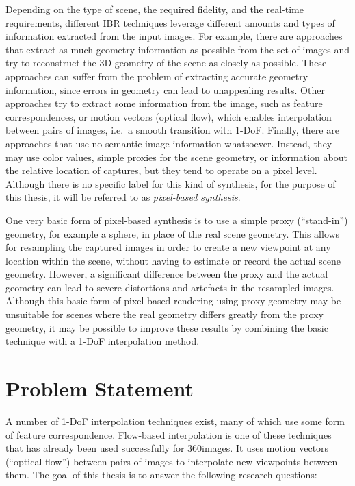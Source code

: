 Depending on the type of scene, the required fidelity, and the real-time requirements, different IBR techniques leverage different amounts and types of information extracted from the input images.
For example, there are approaches that extract as much geometry information as possible from the set of images and try to reconstruct the 3D geometry of the scene as closely as possible. These approaches can suffer from the problem of extracting accurate geometry information, since errors in geometry can lead to unappealing results.
Other approaches try to extract some information from the image, such as feature correspondences, or motion vectors (optical flow), which enables interpolation between pairs of images, i.e.\ a smooth transition with 1-DoF.
Finally, there are approaches that use no semantic image information whatsoever. Instead, they may use color values, simple proxies for the scene geometry, or information about the relative location of captures, but they tend to operate on a pixel level. Although there is no specific label for this kind of synthesis, for the purpose of this thesis, it will be referred to as \emph{pixel-based synthesis}.

One very basic form of pixel-based synthesis is to use a simple proxy (``stand-in'') geometry, for example a sphere, in place of the real scene geometry\footnotemark. This allows for resampling the captured images in order to create a new viewpoint at any location within the scene, without having to estimate or record the actual scene geometry. However, a significant difference between the proxy and the actual geometry can lead to severe distortions and artefacts in the resampled images. Although this basic form of pixel-based rendering using proxy geometry may be unsuitable for scenes where the real geometry differs greatly from the proxy geometry, it may be possible to improve these results by combining the basic technique with a 1-DoF interpolation method.


\section*{Problem Statement}
A number of 1-DoF interpolation techniques exist, many of which use some form of feature correspondence. Flow-based interpolation is one of these techniques that has already been used successfully for 360\degree images. It uses motion vectors (``optical flow'') between pairs of images to interpolate new viewpoints between them. The goal of this thesis is to answer the following research questions:

